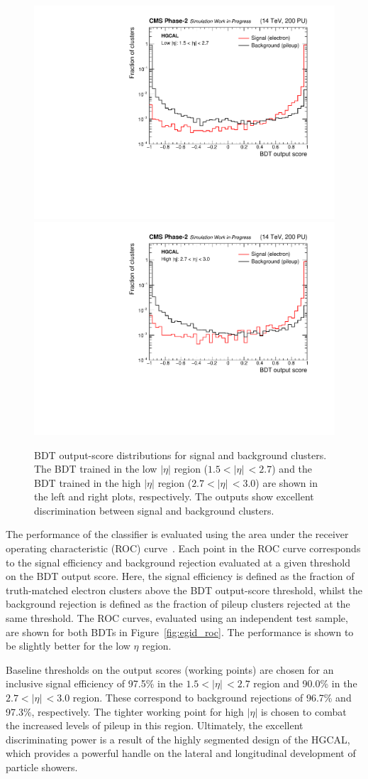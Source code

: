 \begin{figure}
  \centering
  \includegraphics[width=.49\textwidth]{Figures/cms/egid/cl3d_bdt_electron_200PU_vs_neutrino_200PU_full_lo.pdf}
  \includegraphics[width=.49\textwidth]{Figures/cms/egid/cl3d_bdt_electron_200PU_vs_neutrino_200PU_full_hi.pdf}
  \caption[$e/\gamma$ identification output score distributions]
  {
    BDT output-score distributions for signal and background clusters. The BDT trained in the low $|\eta|$ region ($1.5<|\eta|\,<2.7$) and the BDT trained in the high $|\eta|$ region ($2.7<|\eta|\,<3.0$) are shown in the left and right plots, respectively. The outputs show excellent discrimination between signal and background clusters.
  }
  \label{fig:egid_output}
\end{figure}

The performance of the classifier is evaluated using the area under the receiver operating characteristic (ROC) curve~\cite{roc}. Each point in the ROC curve corresponds to the signal efficiency and background rejection evaluated at a given threshold on the BDT output score. Here, the signal efficiency is defined as the fraction of truth-matched electron clusters above the BDT output-score threshold, whilst the background rejection is defined as the fraction of pileup clusters rejected at the same threshold. The ROC curves, evaluated using an independent test sample, are shown for both BDTs in Figure~\ref{fig:egid_roc}. The performance is shown to be slightly better for the low $\eta$ region. 

Baseline thresholds on the output scores (working points) are chosen for an inclusive signal efficiency of 97.5\% in the $1.5<|\eta|\,<2.7$ region and 90.0\% in the $2.7<|\eta|\,<3.0$ region. These correspond to background rejections of 96.7\% and 97.3\%, respectively. The tighter working point for high $|\eta|$ is chosen to combat the increased levels of pileup in this region. Ultimately, the excellent discriminating power is a result of the highly segmented design of the HGCAL, which provides a powerful handle on the lateral and longitudinal development of particle showers.

